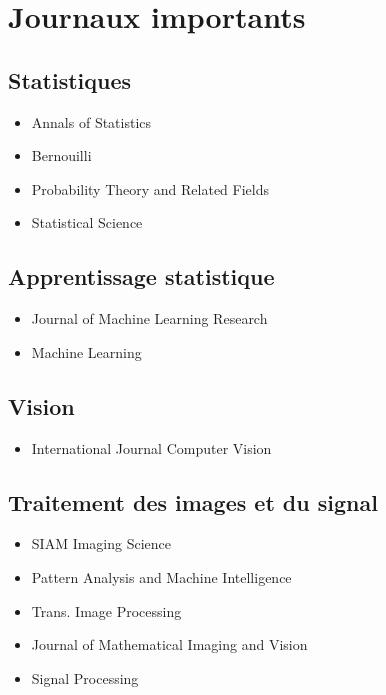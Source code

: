 \section{Journaux importants}


\subsection{Statistiques}
\begin{itemize}
 \item Annals of Statistics
 \item Bernouilli
 \item Probability  Theory and Related Fields
 \item Statistical Science
\end{itemize}

\subsection{Apprentissage statistique}
\begin{itemize}
 \item Journal of Machine Learning Research
 \item Machine Learning
\end{itemize}

\subsection{Vision}
\begin{itemize}
\item International Journal Computer Vision
\end{itemize}

\subsection{Traitement des images et du signal}
\begin{itemize}
 \item SIAM Imaging Science
 \item Pattern Analysis and Machine Intelligence 
 \item Trans. Image Processing
 \item Journal of Mathematical Imaging and Vision
 \item Signal Processing
\end{itemize}




